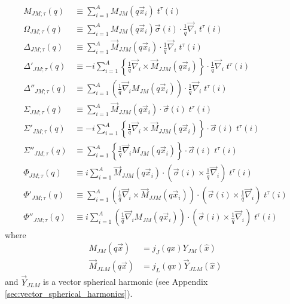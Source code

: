 \documentclass{book}[letterpaper,12pt]
\begin{document}
\begin{equation}
\begin{split}
M_{JM;\tau}(q)&\equiv \sum_{i=1}^AM_{JM}(q\vec{x}_i)\;t^{\tau}(i)\\
\Omega_{JM;\tau}(q)&\equiv \sum_{i=1}^AM_{JM}(q\vec{x}_i)\vec{\sigma}(i)\cdot\frac{1}{q}\vec{\nabla}_i\;t^{\tau}(i)\\
\Delta_{JM;\tau}(q)&\equiv \sum_{i=1}^A \vec{M}_{JJM}(q\vec{x}_i)\cdot\frac{1}{q}\vec{\nabla}_i\;t^{\tau}(i)\\
\Delta'_{JM;\tau}(q)&\equiv -i\sum_{i=1}^A \left\{\frac{1}{q}\vec{\nabla}_i\times\vec{M}_{JJM}(q\vec{x}_i)\right\}\cdot\frac{1}{q}\vec{\nabla}_i\;t^{\tau}(i)\\
\Delta''_{JM;\tau}(q)&\equiv \sum_{i=1}^A\left(\frac{1}{q}\vec{\nabla}_iM_{JM}(q\vec{x}_i)\right)\cdot\frac{1}{q}\vec{\nabla}_i\;t^{\tau}(i)\\
\Sigma_{JM;\tau}(q)&\equiv \sum_{i=1}^A\vec{M}_{JJM}(q\vec{x}_i)\cdot\vec{\sigma}(i)\;t^{\tau}(i)\\
\Sigma'_{JM;\tau}(q)&\equiv -i\sum_{i=1}^A\left\{\frac{1}{q}\vec{\nabla}_i\times\vec{M}_{JJM}(q\vec{x}_i)\right\}\cdot\vec{\sigma}(i)\;t^{\tau}(i)\\
\Sigma''_{JM;\tau}(q)&\equiv \sum_{i=1}^A\left\{\frac{1}{q}\vec{\nabla}_iM_{JM}(q\vec{x}_i)\right\}\cdot\vec{\sigma}(i)\;t^{\tau}(i)\\
\Phi_{JM;\tau}(q)&\equiv i\sum_{i=1}^A\vec{M}_{JJM}(q\vec{x}_i)\cdot\left(\vec{\sigma}(i)\times\frac{1}{q}\vec{\nabla}_i\right)\;t^{\tau}(i)\\
\Phi'_{JM;\tau}(q)&\equiv\sum_{i=1}^A\left(\frac{1}{q}\vec{\nabla}_i\times\vec{M}_{JJM}(q\vec{x}_i)\right)\cdot\left(\vec{\sigma}(i)\times\frac{1}{q}\vec{\nabla}_i\right)\;t^{\tau}(i)\\
\Phi''_{JM;\tau}(q)&\equiv i\sum_{i=1}^A\left(\frac{1}{q}\vec{\nabla}_iM_{JM}(q\vec{x}_i)\right)\cdot\left(\vec{\sigma}(i)\times\frac{1}{q}\vec{\nabla}_i\right)\;t^{\tau}(i)
\label{eq:single_nucleon_responses}
\end{split}
\end{equation}
where 
\begin{equation}
\begin{split}
M_{JM}(q\vec{x})&=j_J(qx)Y_{JM}(\hat{x})\\
\vec{M}_{JLM}(q\vec{x})&=j_L(qx)\vec{Y}_{JLM}(\hat{x})
\end{split}
\end{equation}
and $\vec{Y}_{JLM}$ is a vector spherical harmonic (see Appendix \ref{sec:vector_spherical_harmonics}). 
\end{document}
